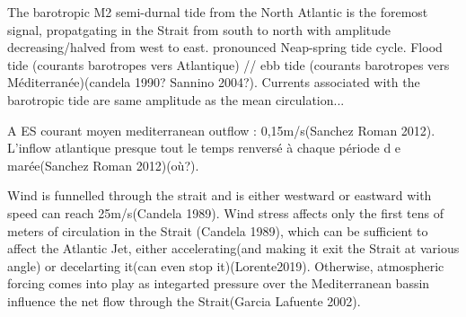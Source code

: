 The barotropic M2 semi-durnal tide from the North Atlantic is the foremost signal, propatgating in the Strait from south to north with amplitude decreasing/halved from west to east\citep{candela_1990}. pronounced Neap-spring tide cycle.  Flood tide (courants barotropes vers Atlantique) // ebb tide (courants barotropes vers Méditerranée)(candela 1990? Sannino 2004?). Currents associated with the barotropic tide are same amplitude as the mean circulation...


A ES courant moyen mediterranean outflow : 0,15m/s(Sanchez Roman 2012). L’inflow atlantique presque tout le temps renversé à chaque période d e marée(Sanchez Roman 2012)(où?).







 Wind is funnelled through the strait and is either westward or eastward with speed can reach 25m/s(Candela 1989). Wind stress affects only the first tens of meters of circulation in the Strait (Candela 1989), which can be sufficient to affect the Atlantic Jet, either accelerating(and making it exit the Strait at various angle) or decelarting it(can even stop it)(Lorente2019). Otherwise, atmospheric forcing comes into play as integarted pressure over the Mediterranean bassin influence the net flow through the Strait(Garcia Lafuente 2002).



